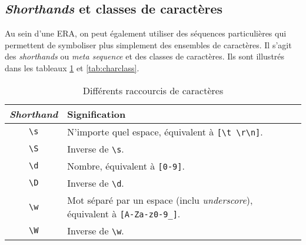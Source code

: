 \subsection{\textit{Shorthands} et classes de caractères}
\vspace{-4mm}
Au sein d'une ERA, on peut également utiliser des séquences particulières qui permettent de symboliser plus simplement des ensembles de caractères. Il s'agit des \textit{shorthands} ou \textit{meta sequence} et des classes de caractères. Ils sont illustrés dans les tableaux \ref{tab:meta} et \ref{tab:charclass}.
\begin{table}[h!]
    \centering
    \begin{tabularx}{\textwidth}{| c | X |}
        \hline
        \textbf{\textit{Shorthand}}         & \textbf{Signification}                                                                                \\
            \hline
        \texttt{\textbackslash s}   & N'importe quel espace, équivalent à \texttt{[\textbackslash t \textbackslash r\textbackslash n]}.       \\
            \hline
        \texttt{\textbackslash S}   & Inverse de \texttt{\textbackslash s}.                                                                 \\
            \hline
        \texttt{\textbackslash d}   & Nombre, équivalent à \texttt{[0-9]}.                                                                  \\
            \hline
        \texttt{\textbackslash D}   & Inverse de \texttt{\textbackslash d}.                                                                 \\
            \hline
        \texttt{\textbackslash w}   & Mot séparé par un espace (inclu \textit{underscore}), équivalent à \texttt{[A-Za-z0-9\_]}.  \\
            \hline
        \texttt{\textbackslash W}   & Inverse de \texttt{\textbackslash w}.                                                                 \\
        \hline
    \end{tabularx}
    {\addtolength{\parskip}{-13mm}\caption{Différents raccourcis de caractères}\label{tab:meta}}
\end{table}\vspace{-5mm}
